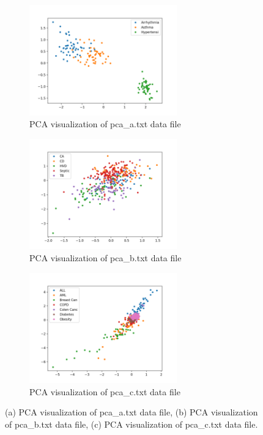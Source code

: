 \documentclass[fleqn]{llncs}
\begin{document}
\begin{figure}
	\centering
	\begin{subfigure}{1.0\textwidth}
		\centering\includegraphics[width=0.7\textwidth]{pcaa_cal.png}
		\caption{PCA visualization of pca\_a.txt data file}
	\end{subfigure}
	\begin{subfigure}{1.0\textwidth}
		\centering\includegraphics[width=0.7\textwidth]{pcab_cal.png}
		\caption{PCA visualization of pca\_b.txt data file}
	\end{subfigure}
	\begin{subfigure}{1.0\textwidth}
		\centering\includegraphics[width=0.7\textwidth]{pcac_cal.png}
		\caption{PCA visualization of pca\_c.txt data file}
	\end{subfigure}
	\caption{(a) PCA visualization of pca\_a.txt data file, (b) PCA visualization of pca\_b.txt data file, (c) PCA visualization of pca\_c.txt data file.}
	\label{fig2}
\end{figure}
\end{document}
